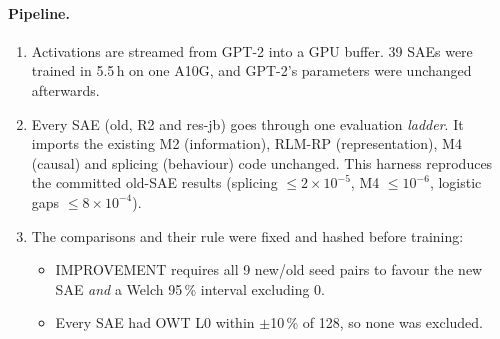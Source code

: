 \paragraph{Pipeline.}
\begin{enumerate}
\item Activations are streamed from GPT-2 into a GPU buffer. 39 SAEs were trained in 5.5\,h on one A10G, and GPT-2's
  parameters were unchanged afterwards.
\item Every SAE (old, R2 and res-jb) goes through one evaluation \emph{ladder}. It imports the existing M2 (information), RLM-RP
  (representation), M4 (causal) and splicing (behaviour) code unchanged. This harness reproduces the committed old-SAE
  results (splicing $\leq 2\times10^{-5}$, M4 $\leq 10^{-6}$, logistic gaps $\leq 8\times10^{-4}$).
\item The comparisons and their rule were fixed and hashed before training:
  \begin{itemize}
  \item IMPROVEMENT requires all 9 new/old seed pairs to favour the new SAE \emph{and} a Welch 95\,\% interval
    excluding 0.
  \item Every SAE had OWT L0 within $\pm$10\,\% of 128, so none was excluded.
  \end{itemize}
\end{enumerate}

